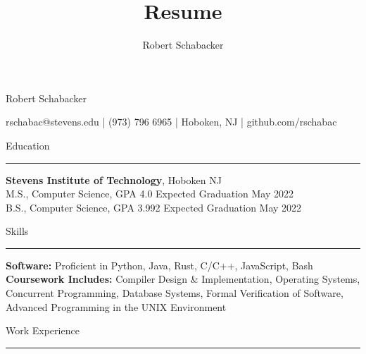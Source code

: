 \documentclass{article}
\title{Resume}
\author{Robert Schabacker}
\newcommand \spacingBetweenHeadings {0.3em}
\newcommand \spacingAfterHeadings {0.5em}
\begin{document}
\begin{center}
{\huge Robert Schabacker\par}
\vspace{0.3em}
{\Large rschabac@stevens.edu  |  (973) 796 6965  |  Hoboken, NJ  |  github.com/rschabac\par}
\end{center}
\vspace{-1.3em}
\vspace{\spacingBetweenHeadings}

\noindent
\huge Education\par
\vspace{0.1em}
\hrule
\Large
\vspace{\spacingAfterHeadings}
\noindent
\textbf{Stevens Institute of Technology}, Hoboken NJ\\
M.S., Computer Science, GPA 4.0
\hfill
Expected Graduation May 2022\\
B.S., Computer Science, GPA 3.992
\hfill
Expected Graduation May 2022



\vspace{\spacingBetweenHeadings}

\noindent
\huge Skills\par
\vspace{0.1em}
\hrule
\Large
\vspace{\spacingAfterHeadings}
\noindent
\textbf{Software:} Proficient in Python, Java, Rust, C/C++, JavaScript, Bash\\
\textbf{Coursework Includes:} Compiler Design \& Implementation, Operating Systems, Concurrent Programming, Database Systems, Formal Verification of Software, Advanced Programming in the UNIX Environment %


\vspace{\spacingBetweenHeadings}

\noindent
\huge Work Experience\par
\vspace{0.1em}
\hrule
\Large
\vspace{\spacingAfterHeadings}
\end{document}
